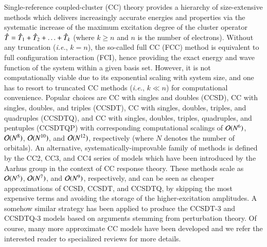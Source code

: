 \documentclass[aip,jcp,reprint,noshowkeys,superscriptaddress]{revtex4-1}
\newcommand{\ie}{\textit{i.e.}}
\newcommand{\hT}{\Hat{T}}
\begin{document}
Single-reference coupled-cluster (CC) theory provides a hierarchy of size-extensive methods which delivers increasingly accurate energies and properties via the systematic increase of the maximum excitation degree of the cluster operator $\hT = \hT_1 + \hT_2 + \ldots + \hT_k$ (where $k \ge n$ and $n$ is the number of electrons).
Without any truncation (\ie, $k = n$), the so-called full CC (FCC) method is equivalent to full configuration interaction (FCI), hence providing the exact energy and wave function of the system within a given basis set.
However, it is not computationally viable due to its exponential scaling with system size, and one has to resort to truncated CC methods  (\ie, $k \ll n$) for computational convenience.
Popular choices are CC with singles and doubles (CCSD), CC with singles, doubles, and triples (CCSDT), CC with singles, doubles, triples, and quadruples (CCSDTQ), and 
CC with singles, doubles, triples, quadruples, and pentuples (CCSDTQP) with corresponding computational scalings of $\order*{N^{6}}$, $\order*{N^{8}}$,  $\order*{N^{10}}$, and  $\order*{N^{12}}$, respectively (where $N$ denotes the number of orbitals).
An alternative, systematically-improvable family of methods is defined by the CC2, CC3, and CC4 series of models which have been introduced by the Aarhus group in the context of CC response theory.
These methods scale as $\order*{N^{5}}$, $\order*{N^{7}}$, and $\order*{N^{9}}$, respectively, and can be seen as cheaper approximations of CCSD, CCSDT, and CCSDTQ, by skipping the most expensive terms and avoiding the storage of the higher-excitation amplitudes.
A somehow similar strategy has been applied to produce the CCSDT-3 and CCSDTQ-3 models based on arguments stemming from perturbation theory.
Of course, many more approximate CC models have been developed and we refer the interested reader to specialized reviews for more details.
\end{document}
